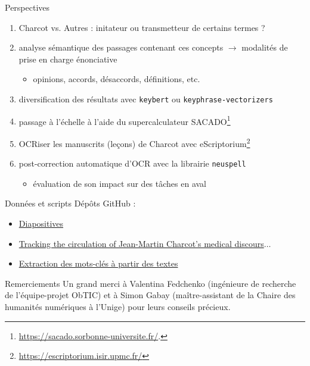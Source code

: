 \begin{frame}{Perspectives}
    \begin{enumerate}
        \item Charcot vs. Autres : initateur ou transmetteur de certains termes ?
        \item analyse sémantique des passages contenant ces concepts $\rightarrow{}$ modalités de prise en charge énonciative
        \begin{itemize}
            \item opinions,
accords, désaccords, définitions, etc.
        \end{itemize}
        \item diversification des résultats avec \texttt{keybert} ou \texttt{keyphrase-vectorizers}
\item passage à l'échelle à l'aide du supercalculateur \textsc{SACADO}\footnote{\url{https://sacado.sorbonne-universite.fr/}.}
        \item \textsc{OCR}iser les manuscrits (\og{}leçons\fg{}) de Charcot avec eScriptorium\footnote{\url{https://escriptorium.isir.upmc.fr/}}
        \item post-correction automatique d'\textsc{OCR} avec la librairie \texttt{neuspell}
		\begin{flushright}
		\vspace{-0.2cm}
	{\footnotesize\citep{jayanthi2020neuspell}}	
	\end{flushright}		       
        \begin{itemize}
        \item évaluation de son impact sur des tâches en aval 
        \end{itemize}
    \end{enumerate}
\end{frame}

\begin{frame}{Données et scripts}
Dépôts GitHub :
\begin{itemize}
\item \href{https://github.com/ljpetkovic/Seminaire_doctoral_CERES_270324/settings}{Diapositives}
\item \href{https://github.com/ljpetkovic/Charcot_circulations}{Tracking the circulation of Jean-Martin Charcot’s medical discours$\dots$}
\item \href{https://github.com/ljpetkovic Charcot_KeyBERT_Keyphrase-Vectorizers}{Extraction des mots-clés à partir des textes}
\end{itemize}
\end{frame}

\begin{frame}{Remerciements}
\justifying
Un grand merci à Valentina Fedchenko (ingénieure de recherche de l'équipe-projet ObTIC) et à Simon Gabay (maître-assistant de la Chaire des humanités numériques à l'Unige) pour leurs conseils précieux.
\end{frame}